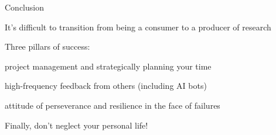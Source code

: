 \documentclass[notes,12pt, aspectratio=169]{beamer}
\newenvironment{wideitemize}{\itemize\addtolength{\itemsep}{15pt}}{\enditemize}
\newenvironment{wideenum}{\enumerate\addtolength{\itemsep}{15pt}}{\endenumerate}
\begin{document}
\begin{frame}{Conclusion}
\begin{wideitemize}
\item It's difficult to transition from being a consumer to a producer of research
\item Three pillars of success:
    \begin{wideenum}
    \vspace{5mm}
    \item project management and strategically planning your time
    \item high-frequency feedback from others (including AI bots)
    \item attitude of perseverance and resilience in the face of failures
    \end{wideenum}
\item Finally, don't neglect your personal life!
\end{wideitemize}
\end{frame}
\end{document}
